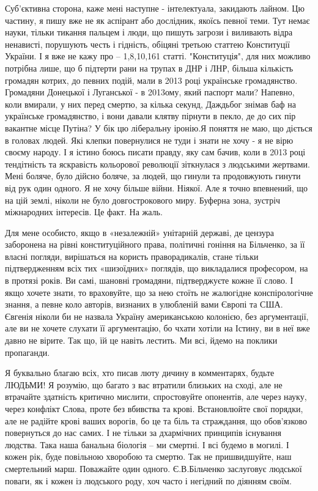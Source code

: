 Суб'єктивна сторона, каже мені наступне - інтелектуала, закидають лайном. Цю
частину, я пишу вже не як аспірант або дослідник, якоїсь певної теми. Тут немає
науки, тільки тикання пальцем і люди, що пишуть загрози і виливають відра
ненависті, порушують честь і гідність, обіцяні  третьою статтею  Конституції
України. І я вже не кажу про – 1,8,10,161 статті. "Конституція", для них
можливо потрібна лише, що б підтерти рани на трупах в ДНР і ЛНР, більша
кількість громадян котрих, до певних подій, мали в 2013 році українське
громадянство. Громадяни Донецької і Луганської - в 2013ому, який паспорт мали?
Напевно, коли вмирали, у них перед смертю, за кілька секунд, Даждьбог знімав
баф на українське громадянство, і вони давали клятву пірнути в пекло, де до сих
пір вакантне місце Путіна? У бік цю ліберальну іронію.Я поняття не маю, що
діється в головах людей. Які клепки повернулися не туди і знати не хочу - я не
вірю своєму народу. І я істино боюсь писати правду, яку сам бачив, коли в 2013
році тендітність та яскравість кольорової революції зіткнулася з людськими
жертвами. Мені боляче, було дійсно боляче, за людей, що гинули та продовжують
гинути від рук один одного. Я не хочу більше війни. Ніякої. Але я точно
впевнений, що на цій землі, ніколи не було довгострокового миру. Буферна зона,
зустріч міжнародних інтересів. Це факт. На жаль.  

Для мене особисто, якщо в «незалежній» унітарній державі, де цензура заборонена
на рівні конституційного права, політичні гоніння на Більченко, за її власні
погляди, вирішаться на користь праворадикалів, стане тільки підтвердженням всіх
тих «шизоїдних» поглядів, що викладалися професором, на в протязі років. Ви
самі, шановні громадяни, підтверджуєте кожне її слово. І якщо хочете знати, то
враховуйте, що за нею стоїть не жалюгідне конспірологічне знання, а певне коло
авторів, визнаних в улюбленій вами Європі та США. Євгенія ніколи би не назвала
Україну американською колонією, без аргументації, але ви не хочете слухати її
аргументацію, бо чхати хотіли на Істину, ви в неї вже давно не вірите.  Так що,
їй це навіть лестить. Ми всі, йдемо на поклики пропаганди. 

Я буквально благаю всіх, хто писав люту дичину в комментарях, будьте ЛЮДЬМИ! Я
розумію, що багато з вас втратили близьких на сході, але не втрачайте здатність
критично мислити, спростовуйте опонентів, але через науку, через конфлікт
Слова, проте без вбивства та крові. Встановлюйте свої порядки, але не радійте
крові ваших ворогів, бо це та біль та страждання, що обов’язково повернуться до
нас самих. І не тільки за дхармічних принципів існування людства. Така наша
банальна біологія – ми смертні. І всі будемо в могилі.  І кожен рік, буде
повільною хворобою та смертю. Так не пришвидшуйте, наш смертельний марш.
Поважайте один одного. Є.В.Більченко заслуговує людської поваги, як і кожен із
людського роду, хоч часто і негідний по діянням своїм. 


